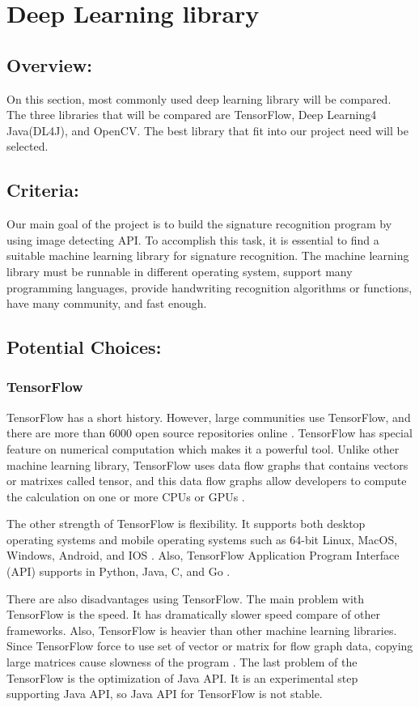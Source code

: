\documentclass[onecolumn, draftclsnofoot,10pt, compsoc]{IEEEtran}
\begin{document}
\section{Deep Learning library}
\subsection{Overview:}
On this section, most commonly used deep learning library will be compared. The three libraries that will be compared are TensorFlow, Deep Learning4 Java(DL4J), and OpenCV. The best library that fit into our project need will be selected.

\subsection{Criteria:}
Our main goal of the project is to build the signature recognition program by using image detecting API. To accomplish this task, it is essential to find a suitable machine learning library for signature recognition. The machine learning library must be runnable in different operating system, support many programming languages, provide handwriting recognition algorithms or functions, have many community, and fast enough. 

\subsection{Potential Choices:}
\subsubsection{TensorFlow}
TensorFlow has a short history. However, large communities use TensorFlow, and there are more than 6000 open source repositories online \cite{TF}. TensorFlow has special feature on numerical computation which makes it a powerful tool. Unlike other machine learning library, TensorFlow uses data flow graphs that contains vectors or matrixes called tensor, and this data flow graphs allow developers to compute the calculation on one or more CPUs or GPUs \cite{TF}.

The other strength of TensorFlow is flexibility. It supports both desktop operating systems and mobile operating systems such as 64-bit Linux, MacOS, Windows, Android, and IOS \cite{TF}. Also, TensorFlow Application Program Interface (API) supports in Python, Java, C, and Go \cite{TF}.

There are also disadvantages using TensorFlow. The main problem with TensorFlow is the speed. It has dramatically slower speed compare of other frameworks. Also, TensorFlow is heavier than other machine learning libraries. Since TensorFlow force to use set of vector or matrix for flow graph data, copying large matrices cause slowness of the program \cite{DL}. The last problem of the TensorFlow is the optimization of Java API. It is an experimental step supporting Java API, so Java API for TensorFlow is not stable.
\end{document}

